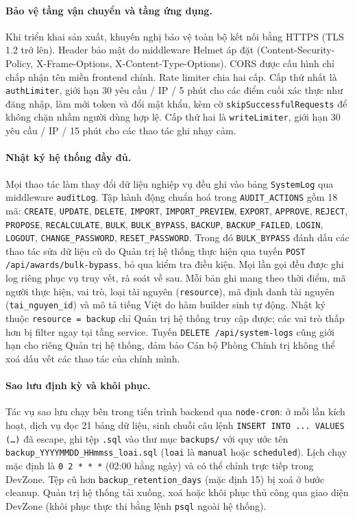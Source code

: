 \documentclass[../DoAn.tex]{subfiles}
\begin{document}
\paragraph{Bảo vệ tầng vận chuyển và tầng ứng dụng.} Khi triển khai sản xuất, khuyến nghị bảo vệ toàn bộ kết nối bằng HTTPS (TLS 1.2 trở lên). Header bảo mật do middleware Helmet áp đặt (Content-Security-Policy, X-Frame-Options, X-Content-Type-Options). CORS được cấu hình chỉ chấp nhận tên miền frontend chính. Rate limiter chia hai cấp. Cấp thứ nhất là \texttt{authLimiter}, giới hạn 30 yêu cầu / IP / 5 phút cho các điểm cuối xác thực như đăng nhập, làm mới token và đổi mật khẩu, kèm cờ \texttt{skipSuccessfulRequests} để không chặn nhầm người dùng hợp lệ. Cấp thứ hai là \texttt{writeLimiter}, giới hạn 30 yêu cầu / IP / 15 phút cho các thao tác ghi nhạy cảm.

\paragraph{Nhật ký hệ thống đầy đủ.} Mọi thao tác làm thay đổi dữ liệu nghiệp vụ đều ghi vào bảng \texttt{SystemLog} qua middleware \texttt{auditLog}. Tập hành động chuẩn hoá trong \texttt{AUDIT\_ACTIONS} gồm 18 mã: \texttt{CREATE}, \texttt{UPDATE}, \texttt{DELETE}, \texttt{IMPORT}, \texttt{IMPORT\_PREVIEW}, \texttt{EXPORT}, \texttt{APPROVE}, \texttt{REJECT}, \texttt{PROPOSE}, \texttt{RECALCULATE}, \texttt{BULK}, \texttt{BULK\_BYPASS}, \texttt{BACKUP}, \texttt{BACKUP\_FAILED}, \texttt{LOGIN}, \texttt{LOGOUT}, \texttt{CHANGE\_PASSWORD}, \texttt{RESET\_PASSWORD}. Trong đó \texttt{BULK\_BYPASS} đánh dấu các thao tác sửa dữ liệu cũ do Quản trị hệ thống thực hiện qua tuyến \texttt{POST /api/awards/bulk-bypass}, bỏ qua kiểm tra điều kiện. Mọi lần gọi đều được ghi log riêng phục vụ truy vết, rà soát về sau. Mỗi bản ghi mang theo thời điểm, mã người thực hiện, vai trò, loại tài nguyên (\texttt{resource}), mã định danh tài nguyên (\texttt{tai\_nguyen\_id}) và mô tả tiếng Việt do hàm builder sinh tự động. Nhật ký thuộc \texttt{resource = backup} chỉ Quản trị hệ thống truy cập được; các vai trò thấp hơn bị filter ngay tại tầng service. Tuyến \texttt{DELETE /api/system-logs} cũng giới hạn cho riêng Quản trị hệ thống, đảm bảo Cán bộ Phòng Chính trị không thể xoá dấu vết các thao tác của chính mình.

\paragraph{Sao lưu định kỳ và khôi phục.} Tác vụ sao lưu chạy bên trong tiến trình backend qua \texttt{node-cron}: ở mỗi lần kích hoạt, dịch vụ đọc 21 bảng dữ liệu, sinh chuỗi câu lệnh \texttt{INSERT INTO ... VALUES (\dots)} đã escape, ghi tệp \texttt{.sql} vào thư mục \texttt{backups/} với quy ước tên \texttt{backup\_YYYYMMDD\_HHmmss\_loai.sql} (\texttt{loai} là \texttt{manual} hoặc \texttt{scheduled}). Lịch chạy mặc định là \texttt{0 2 * * *} (02:00 hằng ngày) và có thể chỉnh trực tiếp trong DevZone. Tệp cũ hơn \texttt{backup\_retention\_days} (mặc định 15) bị xoá ở bước cleanup. Quản trị hệ thống tải xuống, xoá hoặc khôi phục thủ công qua giao diện DevZone (khôi phục thực thi bằng lệnh \texttt{psql} ngoài hệ thống).
\end{document}
